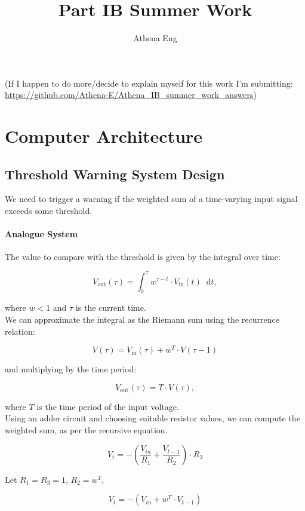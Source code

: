 \documentclass[a4paper, 12pt, oneside]{book}
\title{Part IB Summer Work}
\author{Athena Eng}
\date{}
\newcommand*\diff{\mathop{}\!\mathrm{d}}
\begin{document}
\maketitle
\tableofcontents

\newpage

(If I happen to do more/decide to explain myself for this work I'm submitting: \url{https://github.com/Athena-E/Athena_IB_summer_work_answers})

\newpage

\chapter{Computer Architecture}

\section{Threshold Warning System Design}
We need to trigger a warning if the weighted sum of a time-varying input signal exceeds some
threshold.

\subsubsection{Analogue System}\label{a}

The value to compare with the threshold is given by the integral over time:

\[V_{\text{out}}(\tau)=\int_{0}^{\tau}w^{\tau-t} \cdot V_{\text{in}}(t) \diff t,\]

where $w < 1$ and $\tau$ is the current time.\\

We can approximate the integral as the Riemann sum using the recurrence relation:

\[V(\tau) = V_{\text{in}}(\tau) + {w^T}\cdot V(\tau-1)\]

and multiplying by the time period:

\[V_{\text{out}}(\tau) = T \cdot V(\tau), \]

where $T$ is the time period of the input voltage.\\

Using an adder circuit and choosing suitable resistor values, we can compute the weighted sum, as per the recursive equation.

\[V_t = -\left(\frac{V_{in}}{R_1} + \frac{V_{t-1}}{R_2}\right)\cdot R_3\]

Let $R_1 = R_3 = 1$, $R_2 = w^T$,

\[V_t = -\left({V_{in}} + w^T\cdot {V_{t-1}}\right)\]
\end{document}
